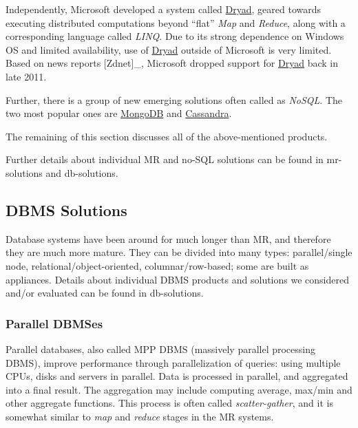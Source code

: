 \documentclass[DM,lsstdraft,toc]{lsstdoc}
\begin{document}
Independently, Microsoft developed a system called
\href{http://research.microsoft.com/en-us/projects/dryad/}{Dryad},
geared towards executing distributed computations beyond ``flat''
\emph{Map} and \emph{Reduce}, along with a corresponding language called
\emph{LINQ}. Due to its strong dependence on Windows OS and limited
availability, use of
\href{http://research.microsoft.com/en-us/projects/dryad/}{Dryad}
outside of Microsoft is very limited. Based on news reports
{[}Zdnet{]}\_, Microsoft dropped support for
\href{http://research.microsoft.com/en-us/projects/dryad/}{Dryad} back
in late 2011.

Further, there is a group of new emerging solutions often called as
\emph{NoSQL}. The two most popular ones are
\href{http://www.mongodb.org/}{MongoDB} and
\href{http://cassandra.apache.org/}{Cassandra}.

The remaining of this section discusses all of the above-mentioned
products.

Further details about individual MR and no-SQL solutions can be found in
mr-solutions and db-solutions.

\subsection{DBMS Solutions}\label{dbms-solutions}

Database systems have been around for much longer than MR, and therefore
they are much more mature. They can be divided into many types:
parallel/single node, relational/object-oriented, columnar/row-based;
some are built as appliances. Details about individual DBMS products and
solutions we considered and/or evaluated can be found in db-solutions.

\subsubsection{Parallel DBMSes}\label{parallel-dbmses}

Parallel databases, also called MPP DBMS (massively parallel processing
DBMS), improve performance through parallelization of queries: using
multiple CPUs, disks and servers in parallel. Data is processed in
parallel, and aggregated into a final result. The aggregation may
include computing average, max/min and other aggregate functions. This
process is often called \emph{scatter-gather}, and it is somewhat
similar to \emph{map} and \emph{reduce} stages in the MR systems.
\end{document}
